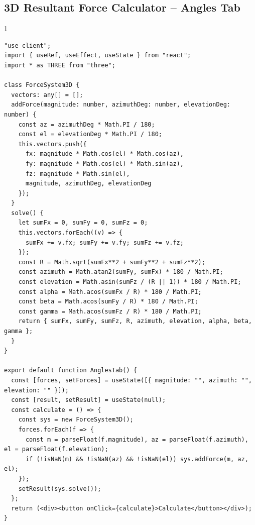 \subsection*{3D Resultant Force Calculator -- Angles Tab}
\begin{spacing}{1}
\begin{Verbatim}[breaklines=true, breaksymbolleft={}, breaksymbolright={}]
"use client";
import { useRef, useEffect, useState } from "react";
import * as THREE from "three";

class ForceSystem3D {
  vectors: any[] = [];
  addForce(magnitude: number, azimuthDeg: number, elevationDeg: number) {
    const az = azimuthDeg * Math.PI / 180;
    const el = elevationDeg * Math.PI / 180;
    this.vectors.push({
      fx: magnitude * Math.cos(el) * Math.cos(az),
      fy: magnitude * Math.cos(el) * Math.sin(az),
      fz: magnitude * Math.sin(el),
      magnitude, azimuthDeg, elevationDeg
    });
  }
  solve() {
    let sumFx = 0, sumFy = 0, sumFz = 0;
    this.vectors.forEach((v) => {
      sumFx += v.fx; sumFy += v.fy; sumFz += v.fz;
    });
    const R = Math.sqrt(sumFx**2 + sumFy**2 + sumFz**2);
    const azimuth = Math.atan2(sumFy, sumFx) * 180 / Math.PI;
    const elevation = Math.asin(sumFz / (R || 1)) * 180 / Math.PI;
    const alpha = Math.acos(sumFx / R) * 180 / Math.PI;
    const beta = Math.acos(sumFy / R) * 180 / Math.PI;
    const gamma = Math.acos(sumFz / R) * 180 / Math.PI;
    return { sumFx, sumFy, sumFz, R, azimuth, elevation, alpha, beta, gamma };
  }
}

export default function AnglesTab() {
  const [forces, setForces] = useState([{ magnitude: "", azimuth: "", elevation: "" }]);
  const [result, setResult] = useState(null);
  const calculate = () => {
    const sys = new ForceSystem3D();
    forces.forEach(f => {
      const m = parseFloat(f.magnitude), az = parseFloat(f.azimuth), el = parseFloat(f.elevation);
      if (!isNaN(m) && !isNaN(az) && !isNaN(el)) sys.addForce(m, az, el);
    });
    setResult(sys.solve());
  };
  return (<div><button onClick={calculate}>Calculate</button></div>);
}
\end{Verbatim}
\end{spacing}

